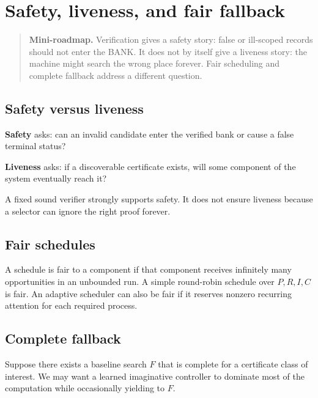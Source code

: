 \documentclass[11pt,openany]{book}
\theoremstyle{definition}
\theoremstyle{remark}
\newenvironment{miniroadmap}{\begin{quote}\small\color{deepblue}\textbf{Mini-roadmap.} }{\end{quote}}
\begin{document}
\chapter{Safety, liveness, and fair fallback}
\begin{miniroadmap}
Verification gives a safety story: false or ill-scoped records should not enter the BANK. It does not by itself give a liveness story: the machine might search the wrong place forever. Fair scheduling and complete fallback address a different question.
\end{miniroadmap}

\section{Safety versus liveness}
\textbf{Safety} asks: can an invalid candidate enter the verified bank or cause a false terminal status?

\textbf{Liveness} asks: if a discoverable certificate exists, will some component of the system eventually reach it?

A fixed sound verifier strongly supports safety. It does not ensure liveness because a selector can ignore the right proof forever.

\section{Fair schedules}
A schedule is fair to a component if that component receives infinitely many opportunities in an unbounded run. A simple round-robin schedule over $P,R,I,C$ is fair. An adaptive scheduler can also be fair if it reserves nonzero recurring attention for each required process.

\section{Complete fallback}
Suppose there exists a baseline search $F$ that is complete for a certificate class of interest. We may want a learned imaginative controller to dominate most of the computation while occasionally yielding to $F$.
\end{document}
